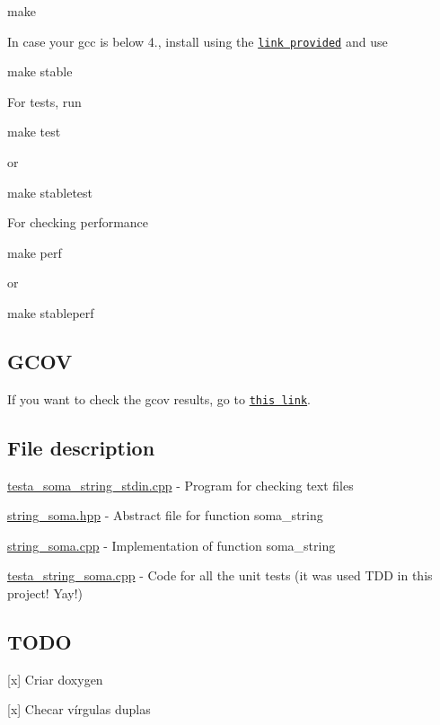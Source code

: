\begin{DoxyCode}
make
\end{DoxyCode}
 In case your gcc is below 4., install using the \href{https://askubuntu.com/questions/428198/getting-installing-gcc-g-4-9-on-ubuntu}{\tt link provided} and use 
\begin{DoxyCode}
make stable
\end{DoxyCode}
 For tests, run 
\begin{DoxyCode}
make test
\end{DoxyCode}
 or 
\begin{DoxyCode}
make stabletest
\end{DoxyCode}
 For checking performance 
\begin{DoxyCode}
make perf
\end{DoxyCode}
 or 
\begin{DoxyCode}
make stableperf
\end{DoxyCode}


\subsection*{G\+C\+OV}

If you want to check the gcov results, go to \href{https://cdn.rawgit.com/alexandrebarbaruiva/projeto1mp/f2607218/coverage.html}{\tt this link}.

\subsection*{File description}


\begin{DoxyItemize}
\item \hyperlink{testa__soma__string__stdin_8cpp}{testa\+\_\+soma\+\_\+string\+\_\+stdin.\+cpp} -\/ Program for checking text files
\item \hyperlink{string__soma_8hpp}{string\+\_\+soma.\+hpp} -\/ Abstract file for function soma\+\_\+string
\item \hyperlink{string__soma_8cpp}{string\+\_\+soma.\+cpp} -\/ Implementation of function soma\+\_\+string
\item \hyperlink{testa__string__soma_8cpp}{testa\+\_\+string\+\_\+soma.\+cpp} -\/ Code for all the unit tests (it was used T\+DD in this project! Yay!)
\end{DoxyItemize}

\subsection*{T\+O\+DO}


\begin{DoxyItemize}
\item \mbox{[}x\mbox{]} Criar doxygen
\item \mbox{[}x\mbox{]} Checar vírgulas duplas 
\end{DoxyItemize}